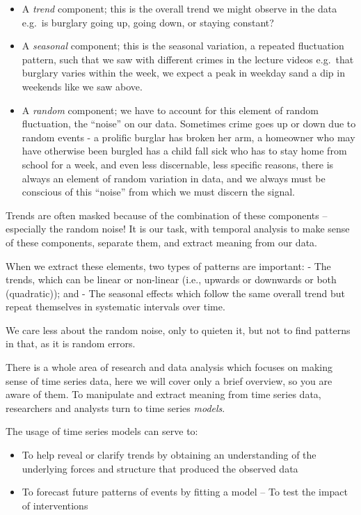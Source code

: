 \documentclass[
]{book}
\providecommand{\tightlist}{%
  \setlength{\itemsep}{0pt}\setlength{\parskip}{0pt}}
\begin{document}
\begin{itemize}
\tightlist
\item
  A \emph{trend} component; this is the overall trend we might observe in the data e.g.~is burglary going up, going down, or staying constant?
\item
  A \emph{seasonal} component; this is the seasonal variation, a repeated fluctuation pattern, such that we saw with different crimes in the lecture videos e.g.~that burglary varies within the week, we expect a peak in weekday sand a dip in weekends like we saw above.
\item
  A \emph{random} component; we have to account for this element of random fluctuation, the ``noise'' on our data. Sometimes crime goes up or down due to random events - a prolific burglar has broken her arm, a homeowner who may have otherwise been burgled has a child fall sick who has to stay home from school for a week, and even less discernable, less specific reasons, there is always an element of random variation in data, and we always must be conscious of this ``noise'' from which we must discern the signal.
\end{itemize}

Trends are often masked because of the combination of these components -- especially the random noise! It is our task, with temporal analysis to make sense of these components, separate them, and extract meaning from our data.

When we extract these elements, two types of patterns are important:
- The trends, which can be linear or non-linear (i.e., upwards or downwards or both (quadratic)); and
- The seasonal effects which follow the same overall trend but repeat themselves in systematic intervals over time.

We care less about the random noise, only to quieten it, but not to find patterns in that, as it is random errors.

There is a whole area of research and data analysis which focuses on making sense of time series data, here we will cover only a brief overview, so you are aware of them. To manipulate and extract meaning from time series data, researchers and analysts turn to time series \emph{models}.

The usage of time series models can serve to:

\begin{itemize}
\tightlist
\item
  To help reveal or clarify trends by obtaining an understanding of the underlying forces and structure that produced the observed data
\item
  To forecast future patterns of events by fitting a model
  -- To test the impact of interventions
\end{itemize}
\end{document}
